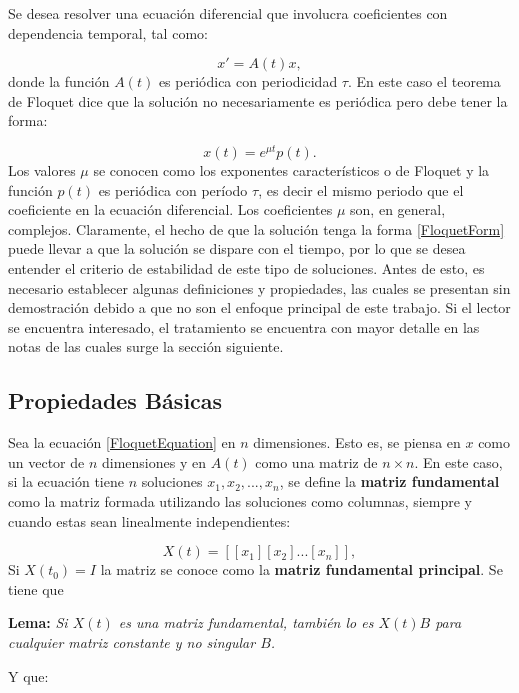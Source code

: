 \documentclass[a4paper,10pt]{report}
\begin{document}
Se desea resolver una ecuación diferencial que involucra coeficientes con dependencia temporal, tal como:

\begin{equation}\label{FloquetEquation}
x' = A(t)x,
\end{equation} donde la función $A(t)$ es periódica con periodicidad $\tau$. En este caso el teorema de Floquet\cite{WardFT} dice que la solución no necesariamente es periódica pero debe tener la forma:

\begin{equation}\label{FloquetForm}
x(t)=e^{\mu t}p(t).
\end{equation} Los valores $\mu$ se conocen como los exponentes característicos o de Floquet y la función $p(t)$ es periódica con período $\tau$, es decir el mismo periodo que el coeficiente en la ecuación diferencial. Los coeficientes $\mu$ son, en general, complejos. Claramente, el hecho de que la solución tenga la forma \ref{FloquetForm} puede llevar a que la solución se dispare con el tiempo, por lo que se desea entender el criterio de estabilidad de este tipo de soluciones. Antes de esto, es necesario establecer algunas definiciones y propiedades, las cuales se presentan sin demostración debido a que no son el enfoque principal de este trabajo. Si el lector se encuentra interesado, el tratamiento se encuentra con mayor detalle en las notas de las cuales surge la sección siguiente. \cite{WardFT}

\subsection{Propiedades Básicas}

Sea la ecuación \ref{FloquetEquation} en $n$ dimensiones. Esto es, se piensa en $x$ como un vector de $n$ dimensiones y en $A(t)$ como una matriz de $n \times n$. En este caso, si la ecuación tiene $n$ soluciones $x_1, x_2, ... , x_n$, se define la \textbf{matriz fundamental} como la matriz formada utilizando las soluciones como columnas, siempre y cuando estas sean linealmente independientes:

\begin{equation}
X(t) = [[x_1][x_2]...[x_n]],
\end{equation}Si $X(t_0) = I$ la matriz se conoce como la \textbf{matriz fundamental principal}. Se tiene que

\begin{center}
\textbf{Lema:} \textit{Si $X(t)$ es una matriz fundamental, también lo es $X(t)B$ para cualquier matriz constante y no singular $B$.}
\end{center}Y que:
\end{document}

